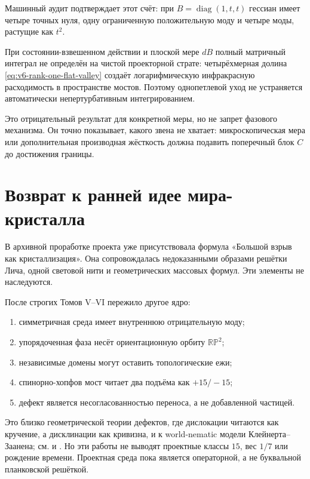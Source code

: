 Машинный аудит подтверждает этот счёт: при
$B=\operatorname{diag}(1,t,t)$ гессиан имеет четыре точных нуля, одну
ограниченную положительную моду и четыре моды, растущие как $t^2$.

\begin{theorem}
При состоянии-взвешенном действии и плоской мере $dB$ полный матричный
интеграл не определён на чистой проекторной страте: четырёхмерная долина
\eqref{eq:v6-rank-one-flat-valley} создаёт логарифмическую инфракрасную
расходимость в пространстве мостов. Поэтому однопетлевой уход не
устраняется автоматически непертурбативным интегрированием.
\end{theorem}

Это отрицательный результат для конкретной меры, но не запрет фазового
механизма. Он точно показывает, какого звена не хватает: микроскопическая
мера или дополнительная производная жёсткость должна подавить поперечный
блок $C$ до достижения границы.

\section{Возврат к ранней идее мира-кристалла}

В архивной проработке проекта уже присутствовала формула «Большой взрыв
как кристаллизация». Она сопровождалась недоказанными образами решётки
Лича, одной световой нити и геометрических массовых формул. Эти элементы
не наследуются.

После строгих Томов V--VI пережило другое ядро:
\begin{enumerate}
 \item симметричная среда имеет внутреннюю отрицательную моду;
 \item упорядоченная фаза несёт ориентационную орбиту $\mathbb{RP}^2$;
 \item независимые домены могут оставить топологические ежи;
 \item спинорно-хопфов мост читает два подъёма как $+15/-15$;
 \item дефект является несогласованностью переноса, а не добавленной
 частицей.
\end{enumerate}

Это близко геометрической теории дефектов, где дислокации читаются как
кручение, а дисклинации как кривизна, и к world-nematic модели
Клейнерта--Заанена; см.  и
. Но эти работы не выводят проектные классы
$15$, вес $1/7$ или рождение времени. Проектная среда пока является
операторной, а не буквальной планковской решёткой.

